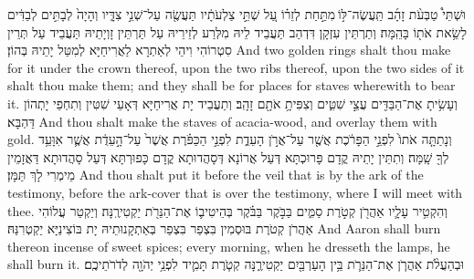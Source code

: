 {%
{וּשְׁתֵּי֩ טַבְּעֹ֨ת זָהָ֜ב תַּֽעֲשֶׂה־לּ֣וֹ \legarmeh  מִתַּ֣חַת לְזֵר֗וֹ עַ֚ל שְׁתֵּ֣י צַלְעֹתָ֔יו תַּעֲשֶׂ֖ה עַל־שְׁנֵ֣י צִדָּ֑יו וְהָיָה֙ לְבָתִּ֣ים לְבַדִּ֔ים לָשֵׂ֥את אֹת֖וֹ בָּהֵֽמָּה׃
}
{וְתַרְתֵּין עִזְקָן דִּדְהַב תַּעֲבֵיד לֵיהּ מִלְּרַע לְזֵירֵיהּ עַל תַּרְתֵּין זָוְיָתֵיהּ תַּעֲבֵיד עַל תְּרֵין סִטְרוֹהִי וִיהֵי לְאַתְרָא לַאֲרִיחַיָּא לְמִטַּל יָתֵיהּ בְּהוֹן׃}
{And two golden rings shalt thou make for it under the crown thereof, upon the two ribs thereof, upon the two sides of it shalt thou make them; and they shall be for places for staves wherewith to bear it.}{}
{וְעָשִׂ֥יתָ אֶת־הַבַּדִּ֖ים עֲצֵ֣י שִׁטִּ֑ים וְצִפִּיתָ֥ אֹתָ֖ם זָהָֽב׃}
{וְתַעֲבֵיד יָת אֲרִיחַיָּא דְּאָעֵי שִׁטִּין וְתִחְפֵי יָתְהוֹן דַּהְבָּא׃}
{And thou shalt make the staves of acacia-wood, and overlay them with gold.}{}
{וְנָתַתָּ֤ה אֹתוֹ֙ לִפְנֵ֣י הַפָּרֹ֔כֶת אֲשֶׁ֖ר עַל־אֲרֹ֣ן הָעֵדֻ֑ת לִפְנֵ֣י הַכַּפֹּ֗רֶת אֲשֶׁר֙ עַל־הָ֣עֵדֻ֔ת אֲשֶׁ֛ר אִוָּעֵ֥ד לְךָ֖ שָֽׁמָּה׃
}
{וְתִתֵּין יָתֵיהּ קֳדָם פָּרוּכְתָּא דְּעַל אֲרוֹנָא דְּסָהֲדוּתָא קֳדָם כָּפוּרְתָּא דְּעַל סָהֲדוּתָא דַּאֲזָמֵין מֵימְרִי לָךְ תַּמָּן׃}
{And thou shalt put it before the veil that is by the ark of the testimony, before the ark-cover that is over the testimony, where I will meet with thee.}{}
{וְהִקְטִ֥יר עָלָ֛יו אַהֲרֹ֖ן קְטֹ֣רֶת סַמִּ֑ים בַּבֹּ֣קֶר בַּבֹּ֗קֶר בְּהֵיטִיב֛וֹ אֶת־הַנֵּרֹ֖ת יַקְטִירֶֽנָּה׃
}
{וְיַקְטַר עֲלוֹהִי אַהֲרֹן קְטֹרֶת בּוּסְמִין בִּצְפַר בִּצְפַר בְּאַתְקָנוּתֵיהּ יָת בּוֹצִינַיָּא יַקְטְרִנַּהּ׃}
{And Aaron shall burn thereon incense of sweet spices; every morning, when he dresseth the lamps, he shall burn it.}{}
{וּבְהַעֲלֹ֨ת אַהֲרֹ֧ן אֶת־הַנֵּרֹ֛ת בֵּ֥ין הָעַרְבַּ֖יִם יַקְטִירֶ֑נָּה קְטֹ֧רֶת תָּמִ֛יד לִפְנֵ֥י יְהֹוָ֖ה לְדֹרֹתֵיכֶֽם׃
}
}

